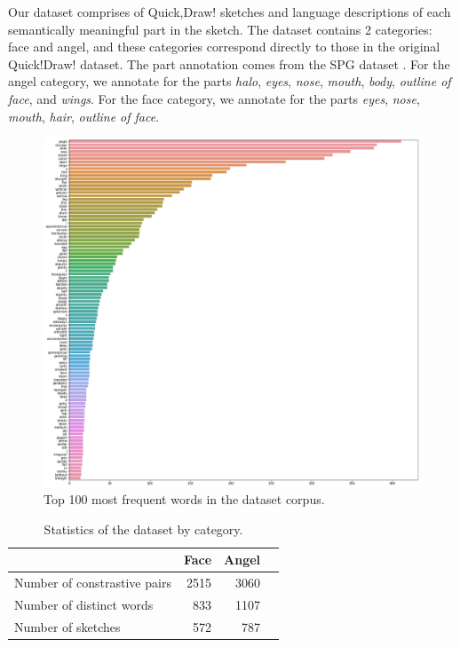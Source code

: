 Our dataset comprises of Quick,Draw! sketches and language descriptions of each semantically meaningful part in the sketch. The dataset contains 2 categories: face and angel, and these categories correspond directly to those in the original Quick!Draw! dataset. The part annotation comes from the SPG dataset \citep{spg_paper}. For the angel category, we annotate for the parts \textit{halo}, \textit{eyes}, \textit{nose}, \textit{mouth}, \textit{body}, \textit{outline of face}, and \textit{wings}. For the face category, we annotate for the parts \textit{eyes}, \textit{nose}, \textit{mouth}, \textit{hair}, \textit{outline of face}. 

\begin{figure}[h]
\includegraphics[width=\linewidth]{dataset_image/word_freq_face.png}  
\caption{Top 100 most frequent words in the dataset corpus.}
\label{word_freq}
\end{figure}

\begin{table}[ht!]
\begin{minipage}{1\textwidth}
\begin{center}
{\small
\begin{tabular}{lrrr}
\toprule
~ & Face & Angel \\
\midrule
Number of constrastive pairs & 2515 & 3060 \\
Number of distinct words & 833 & 1107 \\
Number of sketches & 572 & 787 \\
\bottomrule
\end{tabular}}
\caption{Statistics of the dataset by category.}
\label{table:dataset_stats1}
\end{center}
\end{minipage}
\end{table}


